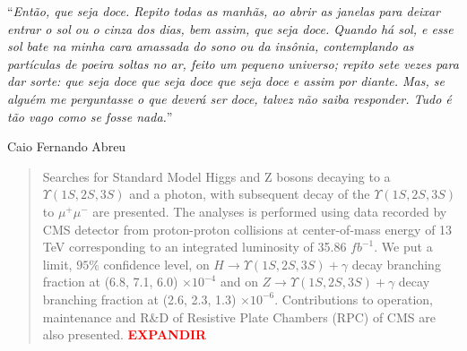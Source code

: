 \documentclass[ 
11pt, %
english, %
onehalfspacing, %
nolistspacing, %
headsepline, %
chapterinoneline, %
]{MastersDoctoralThesis} %
\newcommand{\todo}[1]{
\textcolor{red}{\textbf{#1}}
}
\begin{document}
\vspace*{0.05\textheight}

\noindent\enquote{\itshape Então, que seja doce. Repito todas as manhãs, ao abrir as janelas para deixar entrar o sol ou o cinza dos dias, bem assim, que seja doce. Quando há sol, e esse sol bate na minha cara amassada do sono ou da insônia, contemplando as partículas de poeira soltas no ar, feito um pequeno universo; repito sete vezes para dar sorte: que seja doce que seja doce que seja doce e assim por diante. Mas, se alguém me perguntasse o que deverá ser doce, talvez não saiba responder. Tudo é tão vago como se fosse nada.}\bigbreak

\hfill Caio Fernando Abreu
% 
% 


\begin{abstract}
\addchaptertocentry{\abstractname} %
  Searches for Standard Model Higgs and Z bosons decaying to a  $\Upsilon(1S,2S,3S)$ and a photon, with subsequent decay of the $\Upsilon(1S,2S,3S)$ to $\mu^{+} \mu^{-}$ are presented. The analyses is performed using data recorded by CMS detector from proton-proton collisions at center-of-mass energy of 13 TeV corresponding to an integrated luminosity of 35.86 $fb^{-1}$. We put a limit, $95\%$ confidence level, on $H \rightarrow  \Upsilon(1S,2S,3S) + \gamma$ decay branching fraction at (6.8, 7.1, 6.0) $\times 10^{-4}$ and on $Z\rightarrow  \Upsilon(1S,2S,3S) + \gamma$ decay branching fraction at (2.6, 2.3, 1.3) $\times 10^{-6}$. Contributions to operation, maintenance and R\&D of Resistive Plate Chambers (RPC) of CMS are also presented. \todo{EXPANDIR}
\end{abstract}

\end{document}
